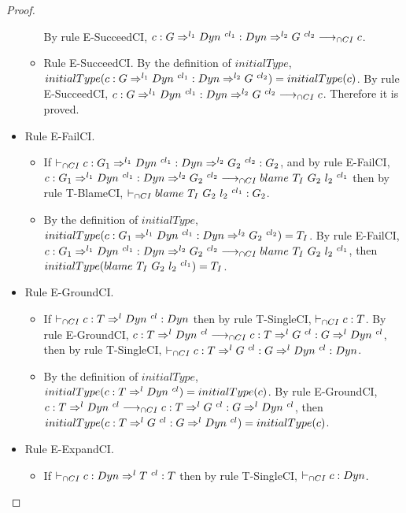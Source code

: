 \documentclass[a4paper]{article}
\begin{document}
\begin{proof}
\begin{itemize}
\begin{itemize}
        By rule E-SucceedCI, $c : G \Rightarrow^{l_1} Dyn\ ^{cl_1} : Dyn \Rightarrow^{l_2} G\ ^{cl_2} \longrightarrow_{\cap CI} c$.
        \item Rule E-SucceedCI.
        By the definition of $initialType$, $initialType(c : G \Rightarrow^{l_1} \Dyn\ ^{cl_1} : \Dyn \Rightarrow^{l_2} G\ ^{cl_2}) = initialType(c)$.
        By rule E-SucceedCI, $c : G \Rightarrow^{l_1} Dyn\ ^{cl_1} : Dyn \Rightarrow^{l_2} G\ ^{cl_2} \longrightarrow_{\cap CI} c$.
        Therefore it is proved.
    \end{itemize}
    \item Rule E-FailCI.
    \begin{itemize}
        \item If $\vdash_{\cap CI} c : G_1 \Rightarrow^{l_1} Dyn\ ^{cl_1} : Dyn \Rightarrow^{l_2} G_2\ ^{cl_2} : G_2$, and by rule E-FailCI, $c : G_1 \Rightarrow^{l_1} \Dyn\ ^{cl_1} : \Dyn \Rightarrow^{l_2} G_2\ ^{cl_2} \cios \blamecast{T_I}{G_2}{l_2}{cl_1}$ then by rule T-BlameCI, $\vdash_{\cap CI} blame\ T_I\ G_2\ l_2\ ^{cl_1} : G_2$.
        \item By the definition of $initialType$, $initialType(c : G_1 \Rightarrow^{l_1} \Dyn\ ^{cl_1} : \Dyn \Rightarrow^{l_2} G_2\ ^{cl_2}) = T_I$.
        By rule E-FailCI, $c : G_1 \Rightarrow^{l_1} \Dyn\ ^{cl_1} : \Dyn \Rightarrow^{l_2} G_2\ ^{cl_2} \cios \blamecast{T_I}{G_2}{l_2}{cl_1}$, then $initialType(blame\ T_I\ G_2\ l_2\ ^{cl_1}) = T_I$.
    \end{itemize}
    \item Rule E-GroundCI.
    \begin{itemize}
        \item If $\cits c : T \Rightarrow^l \Dyn\ ^{cl} : \Dyn$ then by rule T-SingleCI, $\vdash_{\cap CI} c : T$.
        By rule E-GroundCI, $c : T \Rightarrow^l Dyn\ ^{cl} \longrightarrow_{\cap CI} c : T \Rightarrow^l G\ ^{cl} : G \Rightarrow^l Dyn\ ^{cl}$, then by rule T-SingleCI, $\cits c : T \Rightarrow^l G\ ^{cl} : G \Rightarrow^l \Dyn\ ^{cl} : \Dyn$.
        \item By the definition of $initialType$, $initialType(c : T \Rightarrow^l Dyn\ ^{cl}) = initialType(c)$.
        By rule E-GroundCI, $c : T \Rightarrow^l Dyn\ ^{cl} \longrightarrow_{\cap CI} c : T \Rightarrow^l G\ ^{cl} : G \Rightarrow^l Dyn\ ^{cl}$, then $initialType(c : T \Rightarrow^l G\ ^{cl} : G \Rightarrow^l Dyn\ ^{cl}) = initialType(c)$.
    \end{itemize}
    \item Rule E-ExpandCI.
    \begin{itemize}
        \item If $\cits c : \Dyn \Rightarrow^l T\ ^{cl} : T$ then by rule T-SingleCI, $\vdash_{\cap CI} c : Dyn$.

\end{itemize}
\end{itemize}
\end{proof}
\end{document}
